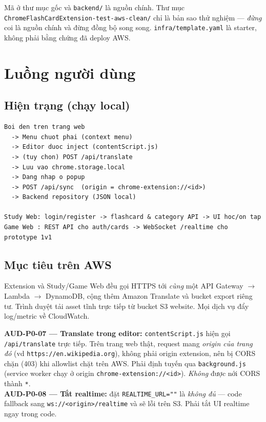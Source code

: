 \documentclass[11pt,a4paper]{article}
\newcommand{\code}[1]{\texttt{#1}}
\begin{document}
\begin{note}
Mã ở thư mục gốc và \code{backend/} là nguồn chính. Thư mục
\code{ChromeFlashCardExtension-test-aws-clean/} chỉ là bản sao thử nghiệm — \emph{đừng} coi là
nguồn chính và đừng đồng bộ song song. \code{infra/template.yaml} là starter, không phải bằng
chứng đã deploy AWS.
\end{note}

\section{Luồng người dùng}

\subsection{Hiện trạng (chạy local)}
\begin{lstlisting}
Boi den tren trang web
  -> Menu chuot phai (context menu)
  -> Editor duoc inject (contentScript.js)
  -> (tuy chon) POST /api/translate
  -> Luu vao chrome.storage.local
  -> Dang nhap o popup
  -> POST /api/sync  (origin = chrome-extension://<id>)
  -> Backend repository (JSON local)

Study Web: login/register -> flashcard & category API -> UI hoc/on tap
Game Web : REST API cho auth/cards -> WebSocket /realtime cho prototype 1v1
\end{lstlisting}

\subsection{Mục tiêu trên AWS}
Extension và Study/Game Web đều gọi HTTPS tới \emph{cùng} một API Gateway $\rightarrow$ Lambda
$\rightarrow$ DynamoDB, cộng thêm Amazon Translate và bucket export riêng tư. Trình duyệt tải
asset tĩnh trực tiếp từ bucket S3 website. Mọi dịch vụ đẩy log/metric về CloudWatch.

\begin{blocker}
\textbf{AUD-P0-07 — Translate trong editor:} \code{contentScript.js} hiện gọi
\code{/api/translate} trực tiếp. Trên trang web thật, request mang \emph{origin của trang đó}
(vd \code{https://en.wikipedia.org}), không phải origin extension, nên bị CORS chặn (403) khi
allowlist chặt trên AWS. Phải định tuyến qua \code{background.js} (service worker chạy ở origin
\code{chrome-extension://<id>}). \emph{Không} được nới CORS thành \code{*}.\\[4pt]
\textbf{AUD-P0-08 — Tắt realtime:} đặt \code{REALTIME\_URL=""} là \emph{không đủ} — code fallback
sang \code{ws://<origin>/realtime} và sẽ lỗi trên S3. Phải tắt UI realtime ngay trong code.
\end{blocker}
\end{document}
